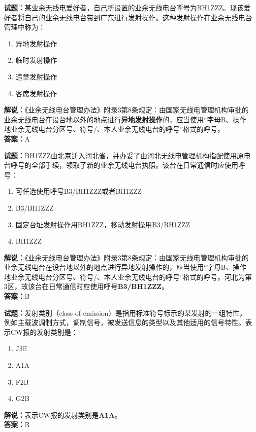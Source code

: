 \documentclass{ctexbook}
\begin{document}
\bigskip




\noindent\textbf{试题：}某业余无线电爱好者，自己所设置的业余无线电台呼号为BH1ZZZ。现该爱好者将自己的业余无线电台带到广东进行发射操作。这种发射操作在业余无线电台管理中称为：
\begin{enumerate}[leftmargin=3em]
\item 异地发射操作
\item 临时发射操作
\item 违章发射操作
\item 客席发射操作
\end{enumerate}
\noindent\textbf{解说：}《业余无线电台管理办法》附录3第8条规定：由国家无线电管理机构审批的业余无线电台在设台地以外的地点进行\textbf{异地发射操作}的，应当使用“字母B、操作地业余无线电台分区号、符号/、本人业余无线电台的呼号”格式的呼号。\\\noindent\textbf{答案：}A

\bigskip




\noindent\textbf{试题：}BH1ZZZ由北京迁入河北省，并办妥了由河北无线电管理机构指配使用原电台呼号的全部手续，领取了新的业余无线电台执照。该台在日常通信时应使用呼号：
\begin{enumerate}[leftmargin=3em]
\item 可任选使用呼号B3/BH1ZZZ或者BH1ZZZ
\item B3/BH1ZZZ
\item 固定台址发射操作用BH1ZZZ，移动发射操用B3/BH1ZZZ
\item BH1ZZZ
\end{enumerate}
\noindent\textbf{解说：}《业余无线电台管理办法》附录3第8条规定：由国家无线电管理机构审批的业余无线电台在设台地以外的地点进行异地发射操作的，应当使用“字母B、操作地业余无线电台分区号、符号/、本人业余无线电台的呼号”格式的呼号。河北为第3区，故该台在日常通信时应使用呼号\textbf{B3/BH1ZZZ}。\\\noindent\textbf{答案：}B

\bigskip




\noindent\textbf{试题：}发射类别（class of emission）是指用标准符号标示的某发射的一组特性，例如主载波调制方式，调制信号，被发送信息的类型以及其他适用的信号特性。表示CW报的发射类别是：
\begin{enumerate}[leftmargin=3em]
\item J3E
\item A1A
\item F2B
\item G2B
\end{enumerate}
\noindent\textbf{解说：}表示CW报的发射类别是\textbf{A1A}。\\\noindent\textbf{答案：}B
\end{document}

